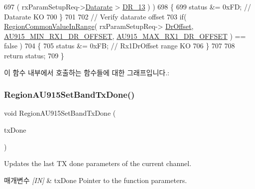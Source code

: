 \begin{DoxyCode}
697         ( rxParamSetupReq->\mbox{\hyperlink{structs_rx_param_setup_req_params_ae2f6080f3aa0e9485c55513ca56bb24d}{Datarate}} > \mbox{\hyperlink{group___r_e_g_i_o_n_ga226f47470cc69a6fe831f7c92709bc1f}{DR\_13}} ) )
698     \{
699         status &= 0xFD; \textcolor{comment}{// Datarate KO}
700     \}
701 
702     \textcolor{comment}{// Verify datarate offset}
703     \textcolor{keywordflow}{if}( \mbox{\hyperlink{group___r_e_g_i_o_n_c_o_m_m_o_n_gafdd1c80d953e18d755a631b72a9c3bd3}{RegionCommonValueInRange}}( rxParamSetupReq->
      \mbox{\hyperlink{structs_rx_param_setup_req_params_ad920e18a48423b1eb1fe40d1b2b082d4}{DrOffset}}, \mbox{\hyperlink{group___r_e_g_i_o_n_a_u915_ga7de844f699bceb5022c05f4ed53d63e9}{AU915\_MIN\_RX1\_DR\_OFFSET}}, 
      \mbox{\hyperlink{group___r_e_g_i_o_n_a_u915_ga6787225088f0c4c8ce35106f5a986f4c}{AU915\_MAX\_RX1\_DR\_OFFSET}} ) == false )
704     \{
705         status &= 0xFB; \textcolor{comment}{// Rx1DrOffset range KO}
706     \}
707 
708     \textcolor{keywordflow}{return} status;
709 \}
\end{DoxyCode}
이 함수 내부에서 호출하는 함수들에 대한 그래프입니다.\+:
\mbox{\label{group___r_e_g_i_o_n_a_u915_ga612ca919a6dcb846f32080a89d3824d7}} 
\subsubsection{\texorpdfstring{Region\+A\+U915\+Set\+Band\+Tx\+Done()}{RegionAU915SetBandTxDone()}}
{\footnotesize\ttfamily void Region\+A\+U915\+Set\+Band\+Tx\+Done (\begin{DoxyParamCaption}\item[{\mbox{\hyperlink{group___r_e_g_i_o_n_gad0524aa0673c0814a71e7a4f9cade3fc}{Set\+Band\+Tx\+Done\+Params\+\_\+t}} $\ast$}]{tx\+Done }\end{DoxyParamCaption})}



Updates the last TX done parameters of the current channel. 


\begin{DoxyParams}{매개변수}
{\em \mbox{[}\+I\+N\mbox{]}} & tx\+Done Pointer to the function parameters. \\
\hline
\end{DoxyParams}


